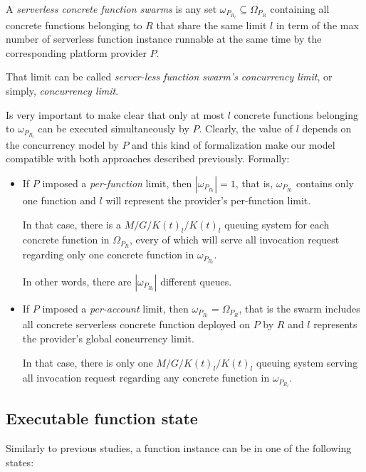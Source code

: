 \documentclass[12pt,a4paper]{report}
\theoremstyle{definition}
\begin{document}
A \textit{serverless concrete function swarms} is any set $\omega_{P_{R_l}} \subseteq \Omega_{P_R}$ containing all concrete functions belonging to $R$ that share the same limit $l$ in term of the max number of serverless function instance runnable at the same time by the corresponding platform provider $P$. 
	
That limit can be called \textit{server-less function swarm's concurrency limit}, or simply, \textit{concurrency limit}.
	
Is very important to make clear that only at most $l$ concrete functions belonging to $\omega_{P_{R_l}}$ can be executed simultaneously by $P$. Clearly, the value of $l$ depends on the concurrency model by $P$ and this kind of formalization make our model compatible with both approaches described previously. Formally:

\begin{itemize}
	
	\item If $P$ imposed a \textit{per-function} limit, then $|\omega_{P_{R_l}}| = 1$, that is, $\omega_{P_{R_l}}$ contains only one function and $l$ will represent the provider's per-function limit. 
	
	In that case, there is a $M/G/K(t)_{l}/K(t)_{l}$ queuing system for each concrete function in $\Omega_{P_R}$, every of which will serve all invocation request regarding only one concrete function in $\omega_{P_{R_l}}$.
	
	In other words, there are $|\omega_{P_{R_l}}|$ different queues.
	
	\item If $P$ imposed a \textit{per-account} limit, then $\omega_{P_{R_l}} = \Omega_{P_R}$, that is the swarm includes all concrete serverless concrete function deployed on $P$ by $R$ and $l$ represents the provider's global concurrency limit. 
	
	In that case, there is only one $M/G/K(t)_{l}/K(t)_{l}$ queuing system serving all invocation request regarding any concrete function in $\omega_{P_{R_l}}$.

\end{itemize}

\subsection{Executable function state}

Similarly to previous studies, a function instance can be in one of the following states: 
\end{document}
